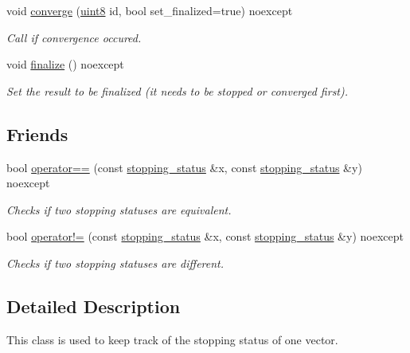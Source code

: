 \begin{DoxyCompactItemize}
void \hyperlink{classgko_1_1stopping__status_a611bf8c81a8e3b22bab8f19ff68e8a12}{converge} (\hyperlink{namespacegko_a3950fc3732811a8563484e5098c31531}{uint8} id, bool set\+\_\+finalized=true) noexcept
\begin{DoxyCompactList}\small\item\em Call if convergence occured. \end{DoxyCompactList}\item 
\mbox{\label{classgko_1_1stopping__status_a56d82a88a20cc1954981e75a66e996bc}} 
void \hyperlink{classgko_1_1stopping__status_a56d82a88a20cc1954981e75a66e996bc}{finalize} () noexcept
\begin{DoxyCompactList}\small\item\em Set the result to be finalized (it needs to be stopped or converged first). \end{DoxyCompactList}\end{DoxyCompactItemize}
\subsection*{Friends}
\begin{DoxyCompactItemize}
\item 
bool \hyperlink{classgko_1_1stopping__status_a7d7a8893aec4d1d561b4f684ca5d090e}{operator==} (const \hyperlink{classgko_1_1stopping__status}{stopping\+\_\+status} \&x, const \hyperlink{classgko_1_1stopping__status}{stopping\+\_\+status} \&y) noexcept
\begin{DoxyCompactList}\small\item\em Checks if two stopping statuses are equivalent. \end{DoxyCompactList}\item 
bool \hyperlink{classgko_1_1stopping__status_a61e994f69678aab2be54a342d4725e6c}{operator!=} (const \hyperlink{classgko_1_1stopping__status}{stopping\+\_\+status} \&x, const \hyperlink{classgko_1_1stopping__status}{stopping\+\_\+status} \&y) noexcept
\begin{DoxyCompactList}\small\item\em Checks if two stopping statuses are different. \end{DoxyCompactList}\end{DoxyCompactItemize}


\subsection{Detailed Description}
This class is used to keep track of the stopping status of one vector. 

